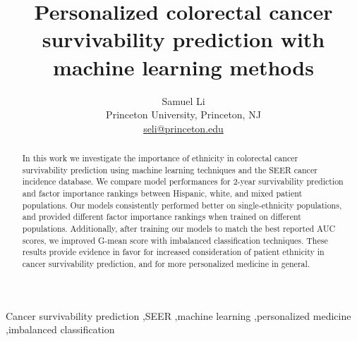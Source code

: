 \documentclass[review]{elsarticle}
\begin{document}
\begin{frontmatter}
	
\title{Personalized colorectal cancer survivability prediction with machine learning methods }
\author{Samuel Li \\ Princeton University, Princeton, NJ \\ \href{mailto:seli@princeton.edu}{seli@princeton.edu}} 






\begin{abstract}
In this work we investigate the importance of ethnicity in colorectal cancer survivability prediction using machine learning techniques and the SEER cancer incidence database. We compare model performances for 2-year survivability prediction and factor importance rankings between Hispanic, white, and mixed patient populations. Our models consistently performed better on single-ethnicity populations, and provided different factor importance rankings when trained on different populations. Additionally, after training our models to match the best reported AUC scores, we improved G-mean score with imbalanced classification techniques. These results provide evidence in favor for increased consideration of patient ethnicity in cancer survivability prediction, and for more personalized medicine in general.
\end{abstract}

\begin{keyword}
Cancer survivability prediction \sep SEER \sep machine learning \sep personalized medicine \sep imbalanced classification
\end{keyword}

\end{frontmatter}
\end{document}
